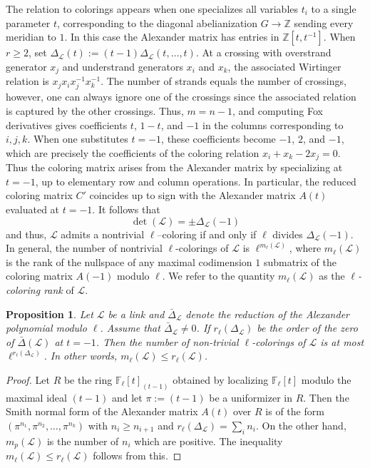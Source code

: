 \documentclass[table]{amsart}
\newtheorem{proposition}[theorem]{Proposition}
\newcommand{\F}{\mathbb{F}}
\newcommand{\cL}{\mathcal{L}}
\newcommand{\cO}{\mathcal{O}}
\numberwithin{equation}{section}
\begin{document}
\par The relation to colorings appears when one specializes all variables $t_i$ to a single parameter $t$, corresponding to the diagonal abelianization $G\to \mathbb Z$ sending every meridian to $1$. In this case the Alexander matrix has entries in $\mathbb Z[t,t^{-1}]$. When $r\geq 2$, set $\Delta_{\cL}(t):=(t-1)\Delta_{\mathcal L}(t,\dots,t)$. At a crossing with overstrand generator $x_j$ and understrand generators $x_i$ and $x_k$, the associated Wirtinger relation is $x_jx_ix_j^{-1}x_k^{-1}$. The number of strands equals the number of crossings, however, one can always ignore one of the crossings since the associated relation is captured by the other crossings. Thus, $m=n-1$, and computing Fox derivatives gives coefficients $t$, $1-t$, and $-1$ in the columns corresponding to $i,j,k$. When one substitutes $t=-1$, these coefficients become $-1$, $2$, and $-1$, which are precisely the coefficients of the coloring relation $x_i+x_k-2x_j=0$. Thus the coloring matrix arises from the Alexander matrix by specializing at $t=-1$, up to elementary row and column operations. In particular, the reduced coloring matrix $C'$ coincides up to sign with the Alexander matrix $A(t)$ evaluated at $t=-1$. It follows that 
\begin{equation}
    \det(\mathcal L) = \pm \Delta_{\mathcal L}(-1)
\end{equation} and thus, $\cL$ admits a nontrivial $\ell$–coloring if and only if $\ell$ divides $\Delta_{\mathcal L}(-1)$. In general, the number of nontrivial $\ell$-colorings of $\cL$ is $\ell^{m_\ell(\cL)}$, where $m_\ell(\cL)$ is the rank of the nullspace of any maximal codimension $1$ submatrix of the coloring matrix $A(-1)$ modulo $\ell$. We refer to the quantity $m_\ell(\cL)$ as the \emph{$\ell$-coloring rank} of $\cL$.

\begin{proposition}\label{coloring rank propn}
    Let $\cL$ be a link and $\bar{\Delta}_\cL$ denote the reduction of the Alexander polynomial modulo $\ell$. Assume that $\bar{\Delta}_\cL\neq 0$. If $r_\ell(\Delta_{\cL})$ be the order of the zero of $\bar{\Delta}(\cL)$ at $t=-1$. Then the number of non-trivial $\ell$-colorings of $\cL$ is at most $\ell^{r_\ell(\Delta_{\cL})}$. In other words, $m_\ell(\cL)\leq r_\ell(\cL)$.
\end{proposition}
\begin{proof}
    Let $R$ be the ring $\F_\ell[t]_{(t-1)}$ obtained by localizing $\F_\ell[t]$ modulo the maximal ideal $(t-1)$ and let $\pi:=(t-1)$ be a uniformizer in $R$. Then the Smith normal form of the Alexander matrix $A(t)$ over $R$ is of the form $(\pi^{n_1}, \pi^{n_2}, \dots, \pi^{n_k})$ with $n_i\geq n_{i+1}$ and $r_\ell(\Delta_{\cL})=\sum_i n_i$. On the other hand, $m_p(\cL)$ is the number of $n_i$ which are positive. The inequality $m_\ell(\cL)\leq r_\ell(\cL)$ follows from this.
\end{proof}
\end{document}
